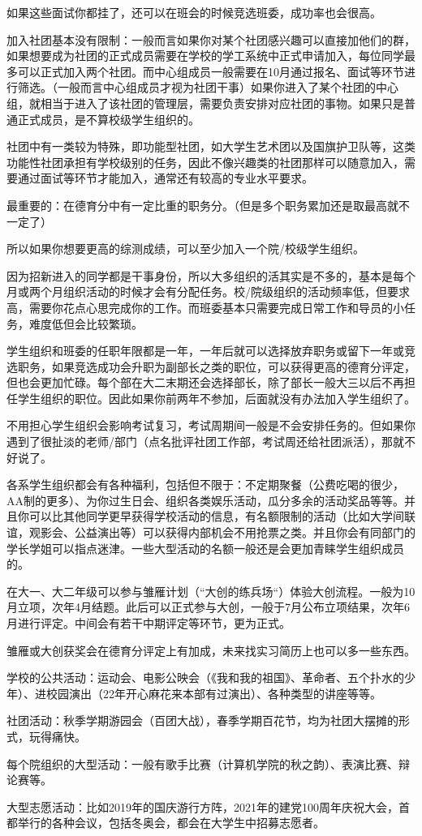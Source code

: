 如果这些面试你都挂了，还可以在班会的时候竞选班委，成功率也会很高。

加入社团基本没有限制：一般而言如果你对某个社团感兴趣可以直接加他们的群，如果想要成为社团的正式成员需要在学校的学工系统中正式申请加入，每位同学最多可以正式加入两个社团。而中心组成员一般需要在10月通过报名、面试等环节进行筛选。（一般而言中心组成员才视为社团干事）如果你进入了某个社团的中心组，就相当于进入了该社团的管理层，需要负责安排对应社团的事物。如果只是普通正式成员，是不算校级学生组织的。

社团中有一类较为特殊，即功能型社团，如大学生艺术团以及国旗护卫队等，这类功能性社团承担有学校级别的任务，因此不像兴趣类的社团那样可以随意加入，需要通过面试等环节才能加入，通常还有较高的专业水平要求。



最重要的：在德育分中有一定比重的职务分。（但是多个职务累加还是取最高就不一定了）

所以如果你想要更高的综测成绩，可以至少加入一个院/校级学生组织。

因为招新进入的同学都是干事身份，所以大多组织的活其实是不多的，基本是每个月或两个月组织活动的时候才会有分配任务。校/院级组织的活动频率低，但要求高，需要你花点心思完成你的工作。而班委基本只需要完成日常工作和导员的小任务，难度低但会比较繁琐。

学生组织和班委的任职年限都是一年，一年后就可以选择放弃职务或留下一年或竞选职务，如果竞选成功会升职为副部长之类的职位，可以获得更高的德育分评定，但也会更加忙碌。每个部在大二末期还会选择部长，除了部长一般大三以后不再担任学生组织的职位。因此如果你前两年不参加，后面就没有办法加入学生组织了。

不用担心学生组织会影响考试复习，考试周期间一般是不会安排任务的。但如果你遇到了很扯淡的老师/部门（点名批评社团工作部，考试周还给社团派活），那就不好说了。

各系学生组织都会有各种福利，包括但不限于：不定期聚餐（公费吃喝的很少，AA制的更多）、为你过生日会、组织各类娱乐活动，瓜分多余的活动奖品等等。并且你可以比其他同学更早获得学校活动的信息，有名额限制的活动（比如大学间联谊，观影会、公益演出等）可以获得内部机会不用抢票之类。并且你会有同部门的学长学姐可以指点迷津。一些大型活动的名额一般还是会更加青睐学生组织成员的。


在大一、大二年级可以参与雏雁计划（“大创的练兵场“）体验大创流程。一般为10月立项，次年4月结题。此后可以正式参与大创，一般于7月公布立项结果，次年6月进行评定。中间会有若干中期评定等环节，更为正式。

雏雁或大创获奖会在德育分评定上有加成，未来找实习简历上也可以多一些东西。


学校的公共活动：运动会、电影公映会（《我和我的祖国》、革命者、五个扑水的少年）、进校园演出（22年开心麻花来本部有过演出）、各种类型的讲座等等。

社团活动：秋季学期游园会（百团大战），春季学期百花节，均为社团大摆摊的形式，玩得痛快。

每个院组织的大型活动：一般有歌手比赛（计算机学院的秋之韵）、表演比赛、辩论赛等。

大型志愿活动：比如2019年的国庆游行方阵，2021年的建党100周年庆祝大会，首都举行的各种会议，包括冬奥会，都会在大学生中招募志愿者。
